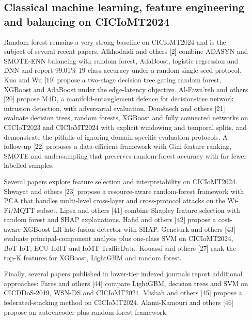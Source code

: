 \documentclass[11pt]{article}
\begin{document}
\subsection{Classical machine learning, feature engineering and balancing on CICIoMT2024}
Random forest remains a very strong baseline on CICIoMT2024 and is the subject of several recent papers. Alkhodaidi and others [2] combine ADASYN and SMOTE-ENN balancing with random forest, AdaBoost, logistic regression and DNN and report 99.01\% 19-class accuracy under a random single-seed protocol. Kuo and Wu [19] propose a two-stage decision tree gating random forest, XGBoost and AdaBoost under the edge-latency objective. Al-Fawa'reh and others [20] propose M4D, a manifold-entanglement defence for decision-tree network intrusion detection, with adversarial evaluation. Doménech and others [21] evaluate decision trees, random forests, XGBoost and fully connected networks on CICIoT2023 and CICIoMT2024 with explicit windowing and temporal splits, and demonstrate the pitfalls of ignoring domain-specific evaluation protocols. A follow-up [22] proposes a data-efficient framework with Gini feature ranking, SMOTE and undersampling that preserves random-forest accuracy with far fewer labelled samples.

Several papers explore feature selection and interpretability on CICIoMT2024. Shwayat and others [23] propose a resource-aware random-forest framework with PCA that handles multi-level cross-layer and cross-protocol attacks on the Wi-Fi/MQTT subset. Lipsa and others [41] combine Shapley feature selection with random forest and SHAP explanations. Hafid and others [42] propose a cost-aware XGBoost-LR late-fusion detector with SHAP. Gencturk and others [43] evaluate principal-component analysis plus one-class SVM on CICIoMT2024, BoT-IoT, ECU-IoHT and IoMT-TrafficData. Kouassi and others [27] rank the top-K features for XGBoost, LightGBM and random forest.

Finally, several papers published in lower-tier indexed journals report additional approaches: Fares and others [44] compare LightGBM, decision trees and SVM on CICDDoS-2019, WSN-DS and CICIoMT2024. Misbah and others [45] propose a federated-stacking method on CICIoMT2024. Alami-Kamouri and others [46] propose an autoencoder-plus-random-forest framework.
\end{document}
